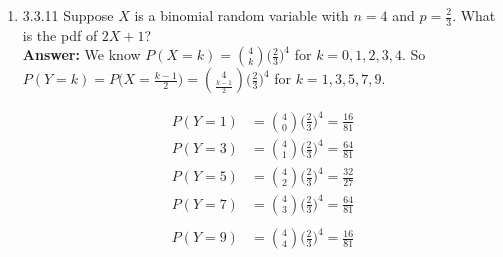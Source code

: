 \documentclass{article}
\begin{document}
\begin{enumerate}
        \item 3.3.11 Suppose $X$ is a binomial random variable with $n=4$ and $p=\frac{2}{3}$. What is the pdf of $2X+1$?\\
        \textbf{Answer: }We know $P(X=k) = {4 \choose k}\big(\frac{2}{3}\big)^4$ for $k=0,1,2,3,4$. So $P(Y=k) = P\big(X=\frac{k-1}{2}\big) = {4 \choose \frac{k-1}{2}}\big(\frac{2}{3}\big)^4$ for $k=1,3,5,7,9$.
            \begin{multicols}{3}
                \begin{align*}
                    P(Y=1) &= {4 \choose 0}\bigg(\frac{2}{3}\bigg)^4 = \frac{16}{81}\\
                    P(Y=3) &= {4 \choose 1}\bigg(\frac{2}{3}\bigg)^4 = \frac{64}{81}
                \end{align*}
                \columnbreak
                \begin{align*}
                    P(Y=5) &= {4 \choose 2}\bigg(\frac{2}{3}\bigg)^4 = \frac{32}{27}\\
                    P(Y=7) &= {4 \choose 3}\bigg(\frac{2}{3}\bigg)^4 = \frac{64}{81}\\
                \end{align*}
                \columnbreak
                \begin{align*}
                    P(Y=9) &= {4 \choose 4}\bigg(\frac{2}{3}\bigg)^4 = \frac{16}{81}
                \end{align*}
            \end{multicols}
    \end{enumerate}
    
\end{document}
